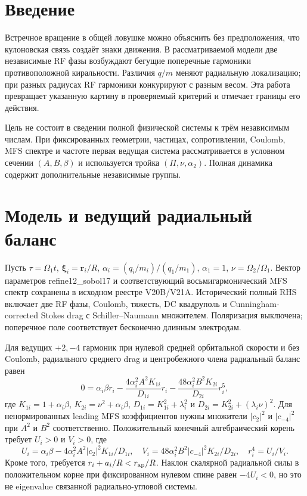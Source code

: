 \documentclass[aip,cha,reprint,amsmath,amssymb]{revtex4-2}
\begin{document}
\section{Введение}
Встречное вращение в общей ловушке можно объяснить без предположения, что кулоновская связь создаёт знаки движения. В рассматриваемой модели две независимые RF фазы возбуждают бегущие поперечные гармоники противоположной киральности. Различия $q/m$ меняют радиальную локализацию; при разных радиусах RF гармоники конкурируют с разным весом. Эта работа превращает указанную картину в проверяемый критерий и отмечает границы его действия.

Цель не состоит в сведении полной физической системы к трём независимым числам. При фиксированных геометрии, частицах, сопротивлении, Coulomb, MFS спектре и частоте первая ведущая система рассматривается в условном сечении $(A,B,\beta)$ и используется тройка $(\Pi,\nu,\alpha_2)$. Полная динамика содержит дополнительные независимые группы.

\section{Модель и ведущий радиальный баланс}
Пусть $\tau=\Omega_1t$, $\bm\xi_i=\bm r_i/R$, $\alpha_i=(q_i/m_i)/(q_1/m_1)$, $\alpha_1=1$, $\nu=\Omega_2/\Omega_1$. Вектор параметров refine12\_sobol17 и соответствующий восьмигармонический MFS спектр сохранены в исходном реестре V20B/V21A. Исторический полный RHS включает две RF фазы, Coulomb, тяжесть, DC квадруполь и Cunningham-corrected Stokes drag с Schiller--Naumann множителем. Поляризация выключена; поперечное поле соответствует бесконечно длинным электродам.

Для ведущих $+2,-4$ гармоник при нулевой средней орбитальной скорости и без Coulomb, радиального среднего drag и центробежного члена радиальный баланс равен
\begin{equation}
0=\alpha_i\beta r_i-\frac{4\alpha_i^2 A^2 K_{1i}}{D_{1i}}r_i
-\frac{48\alpha_i^2 B^2 K_{2i}}{D_{2i}}r_i^5,
\end{equation}
где $K_{1i}=1+\alpha_i\beta$, $K_{2i}=\nu^2+\alpha_i\beta$,
$D_{1i}=K_{1i}^2+\lambda_i^2$ и $D_{2i}=K_{2i}^2+(\lambda_i\nu)^2$.
Для ненормированных leading MFS коэффициентов нужны множители $|c_2|^2$ и $|c_{-4}|^2$ при $A^2$ и $B^2$ соответственно. Положительный конечный алгебраический корень требует $U_i>0$ и $V_i>0$, где
\begin{equation}
U_i=\alpha_i\beta-4\alpha_i^2 A^2|c_2|^2K_{1i}/D_{1i},\quad
V_i=48\alpha_i^2 B^2|c_{-4}|^2K_{2i}/D_{2i},\quad r_i^4=U_i/V_i.
\end{equation}
Кроме того, требуется $r_i+a_i/R<r_{\rm ap}/R$. Наклон скалярной радиальной силы в положительном корне при фиксированном нулевом спине равен $-4U_i<0$, но это не eigenvalue связанной радиально-угловой системы.
\end{document}
